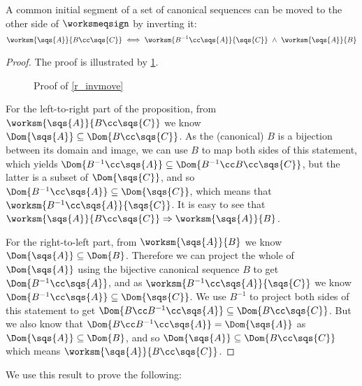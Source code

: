\newcommand{\ia}{\sqs{A}}
\newcommand{\ic}{\sqs{C}}
\newcommand{\ibi}{B^{-1}}

\begin{mylem}
A common initial segment of a set of canonical sequences can be moved 
to the other side of $\worksmeqsign$ by inverting it:
\begin{gather*}
\worksm{\ia}{B\cc\ic}
\ \Longleftrightarrow \ \worksm{\ibi\cc\ia}{\ic} 
\ \wedge \  \worksm{\ia}{B}
\end{gather*}
\end{mylem}
\begin{proof}

The proof is illustrated by \cref{fig_invmove}.

\begin{figure}[htb]

\caption{Proof of \cref{r_invmove}}\label{fig_invmove}
\end{figure}

For the left-to-right part of the proposition,
from $\worksm{\ia}{B\cc\ic}$ we know $\Dom{\ia} \subseteq \Dom{B\cc\ic}$.
As the (canonical) $B$ is a bijection between its domain and image,
we can use $B$ to map both sides of this statement, which yields
$\Dom{B^{-1}\cc\ia} \subseteq \Dom{\ibi\cc B\cc\ic}$,
but the latter is a subset of $\Dom{\ic}$,
and so $\Dom{\ibi\cc\ia} \subseteq \Dom{\ic}$,
which means that $\worksm{\ibi\cc\ia}{\ic}$.
It is easy to see that $\worksm{\ia}{B\cc\ic} \Rightarrow \worksm{\ia}{B}$.

For the right-to-left part,
from $\worksm{\ia}{B}$ we know $\Dom{\ia} \subseteq \Dom{B}$.
Therefore we can project the whole of $\Dom{\ia}$ using the bijective canonical sequence $B$
to get $\Dom{\ibi\cc\ia}$, and as $\worksm{\ibi\cc\ia}{\ic}$
we know
$\Dom{\ibi\cc\ia} \subseteq \Dom{\ic}$.
We use $\ibi$ to project both sides of this statement to get
$\Dom{B\cc\ibi\cc\ia} \subseteq \Dom{B\cc\ic}$.
But we also know that $\Dom{B\cc\ibi\cc\ia} = \Dom{\ia}$
as $\Dom{\ia} \subseteq \Dom{B}$,
and so $\Dom{\ia} \subseteq \Dom{B\cc\ic}$ which means
$\worksm{\ia}{B\cc\ic}$.
\end{proof}



We use this result to prove the following:

